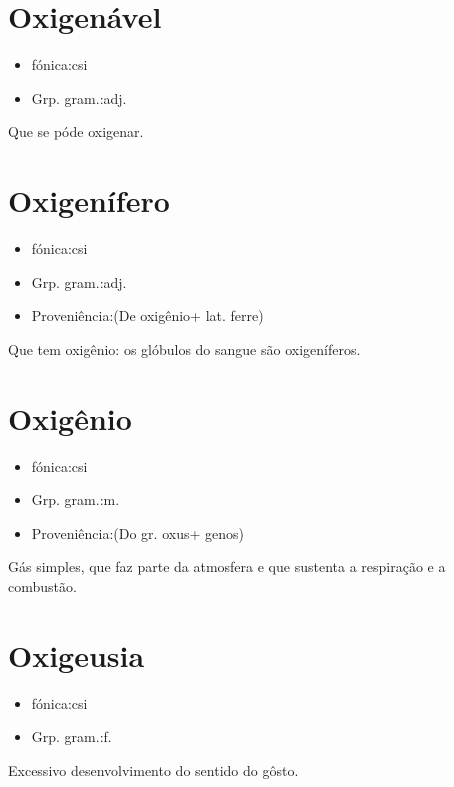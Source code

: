 \section{Oxigenável}
\begin{itemize}
\item {fónica:csi}
\end{itemize}
\begin{itemize}
\item {Grp. gram.:adj.}
\end{itemize}
Que se póde oxigenar.
\section{Oxigenífero}
\begin{itemize}
\item {fónica:csi}
\end{itemize}
\begin{itemize}
\item {Grp. gram.:adj.}
\end{itemize}
\begin{itemize}
\item {Proveniência:(De \textunderscore oxigênio\textunderscore  + lat. \textunderscore ferre\textunderscore )}
\end{itemize}
Que tem oxigênio: \textunderscore os glóbulos do sangue são oxigeníferos\textunderscore .
\section{Oxigênio}
\begin{itemize}
\item {fónica:csi}
\end{itemize}
\begin{itemize}
\item {Grp. gram.:m.}
\end{itemize}
\begin{itemize}
\item {Proveniência:(Do gr. \textunderscore oxus\textunderscore  + \textunderscore genos\textunderscore )}
\end{itemize}
Gás simples, que faz parte da atmosfera e que sustenta a respiração e a combustão.
\section{Oxigeusia}
\begin{itemize}
\item {fónica:csi}
\end{itemize}
\begin{itemize}
\item {Grp. gram.:f.}
\end{itemize}
Excessivo desenvolvimento do sentido do gôsto.
